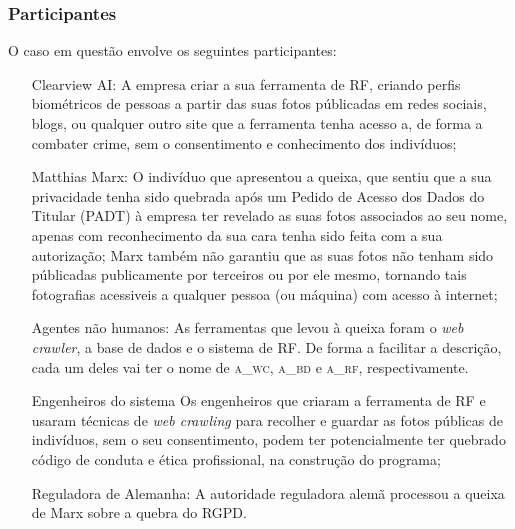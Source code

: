 \documentclass[12pt]{../diazessay}
\begin{document}
\subsubsection*{Participantes}
O caso em questão envolve os seguintes participantes\parencite{first}: 
\begin{itemize}
  \item[Clearview AI:] A empresa criar a sua ferramenta de RF, criando perfis biométricos de pessoas a partir das suas fotos públicadas em redes sociais, blogs, ou qualquer outro site que a ferramenta tenha acesso a, de forma a combater crime, sem o consentimento e conhecimento dos indivíduos;
  \item[Matthias Marx:] O indivíduo que apresentou a queixa, que sentiu que a sua privacidade tenha sido quebrada após um Pedido de Acesso dos Dados do Titular (PADT) à empresa ter revelado as suas fotos associados ao seu nome, apenas com reconhecimento da sua cara tenha sido feita com a sua autorização; Marx também não garantiu que as suas fotos não tenham sido públicadas publicamente por terceiros ou por ele mesmo, tornando tais fotografias acessiveis a qualquer pessoa (ou máquina) com acesso à internet;
  \item[Agentes não humanos: ] As ferramentas que levou à queixa foram o \textit{web crawler}, a base de dados e o sistema de RF. De forma a facilitar a descrição, cada um deles vai ter o nome de \textsc{a\_wc}, \textsc{a\_bd} e \textsc{a\_rf}, respectivamente.
  \item[Engenheiros do sistema] Os engenheiros que criaram a ferramenta de RF e usaram técnicas de \textit{web crawling} para recolher e guardar as fotos públicas de indivíduos, sem o seu consentimento, podem ter potencialmente ter quebrado código de conduta e ética profissional, na construção do programa;
  \item[Reguladora de Alemanha:] A autoridade reguladora alemã processou a queixa de Marx sobre a quebra do RGPD.
\end{itemize}
\end{document}
